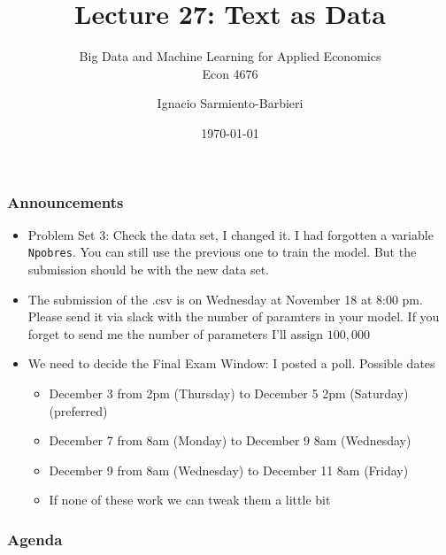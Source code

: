 \documentclass[
  shownotes,
  xcolor={svgnames},
  hyperref={colorlinks,citecolor=DarkBlue,linkcolor=DarkRed,urlcolor=DarkBlue}
  , aspectratio=169]{beamer}
\begin{document}
 
\title[Lecture 27]{Lecture 27:  Text as Data}
\subtitle{Big Data and Machine Learning for Applied Economics \\ Econ 4676}
\date{\today}

\author[Sarmiento-Barbieri]{Ignacio Sarmiento-Barbieri}


\begin{frame}[noframenumbering]
\maketitle
\end{frame}




\begin{frame}
\frametitle{Announcements}

\begin{itemize}
\item Problem Set 3: Check the data set, I changed it. I had forgotten a variable {\tt Npobres}. You can still use the previous one to train the model. But the submission should be with the new data set.
\medskip
\item The submission of the .csv is on Wednesday at November 18 at 8:00 pm. Please send it via slack with the number of paramters in your model. If you forget to send me the number of parameters I'll assign $100,000$
\medskip
\item We need to decide the Final Exam Window: I posted a poll. Possible dates
\begin{itemize}
  \item December 3 from 2pm (Thursday) to December 5 2pm (Saturday) (preferred)
  \item December 7 from 8am (Monday) to December 9 8am (Wednesday)
  \item December 9 from 8am (Wednesday) to December 11 8am (Friday)
  \item If none of these work we can tweak them a little bit

\end{itemize}
\end{itemize}

\end{frame}


\begin{frame}
\frametitle{Agenda}

\tableofcontents

\end{frame}
\end{document}
